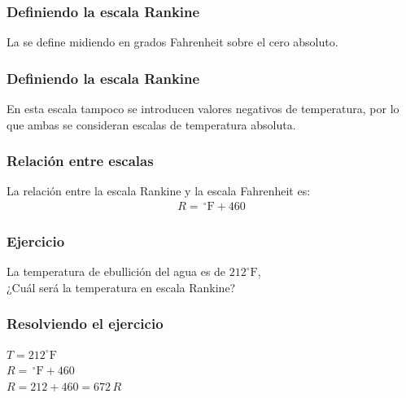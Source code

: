 \documentclass[14pt]{beamer}
\begin{document}
\begin{frame}
\frametitle{Definiendo la escala Rankine}
La  se define midiendo en grados Fahrenheit sobre el cero absoluto.
\end{frame}
\begin{frame}
\frametitle{Definiendo la escala Rankine}
En esta escala tampoco se introducen valores negativos de temperatura, \pause por lo que ambas se consideran escalas de temperatura absoluta.
\end{frame}
\begin{frame}
\frametitle{Relación entre escalas}
La relación entre la escala Rankine y la escala Fahrenheit es:
\pause
\begin{align*}
R = \, ^{\circ}\text{F} + 460
\end{align*}
\end{frame}
\begin{frame}
\frametitle{Ejercicio}
La temperatura de ebullición del agua es de $212 ^{\circ}\text{F}$,
\\
\bigskip
\pause
¿Cuál será la temperatura en escala Rankine?
\end{frame}
\begin{frame}
\frametitle{Resolviendo el ejercicio}
 $T = 212 ^{\circ}\text{F}$  \\[0.5em]\pause
{} $R = \, ^{\circ}\text{F} + 460$ \\[0.5em]\pause
{} $R = 212 + 460 = 672 \, R$
\end{frame}
\end{document}
